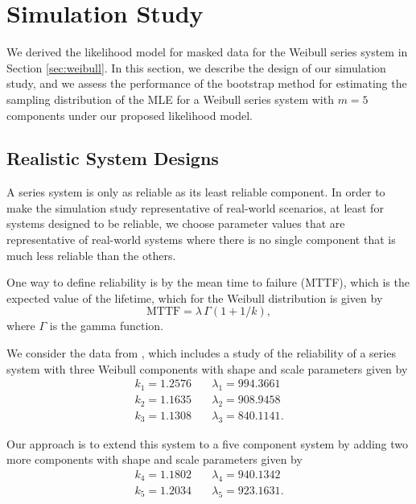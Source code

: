 \documentclass[
]{article}
\begin{document}
\hypertarget{simstudy}{%
\section{Simulation Study}\label{simstudy}}

We derived the likelihood model for masked data for the Weibull series
system in Section \ref{sec:weibull}. In this section, we describe the
design of our simulation study, and we assess the performance of the
bootstrap method for estimating the sampling distribution of the MLE for
a Weibull series system with \(m=5\) components under our proposed
likelihood model.

\hypertarget{realistic-system-designs}{%
\subsection{Realistic System Designs}\label{realistic-system-designs}}

A series system is only as reliable as its least reliable component. In
order to make the simulation study representative of real-world
scenarios, at least for systems designed to be reliable, we choose
parameter values that are representative of real-world systems where
there is no single component that is much less reliable than the others.

One way to define reliability is by the mean time to failure (MTTF),
which is the expected value of the lifetime, which for the Weibull
distribution is given by \[
\text{MTTF} = \lambda \, \Gamma(1 + 1/k),
\] where \(\Gamma\) is the gamma function.

We consider the data from \citep{Huairu-2013}, which includes a study of
the reliability of a series system with three Weibull components with
shape and scale parameters given by \begin{equation}
\begin{aligned}
    k_1 = 1.2576 &\quad \lambda_1 = 994.3661\\
    k_2 = 1.1635 &\quad \lambda_2 = 908.9458\\
    k_3 = 1.1308 &\quad \lambda_3 = 840.1141.
\end{aligned}
\end{equation}

Our approach is to extend this system to a five component system by
adding two more components with shape and scale parameters given by
\begin{equation}
\begin{aligned}
    k_4 = 1.1802 &\quad \lambda_4 = 940.1342\\
    k_5 = 1.2034 &\quad \lambda_5 = 923.1631.
\end{aligned}
\end{equation}
\end{document}
